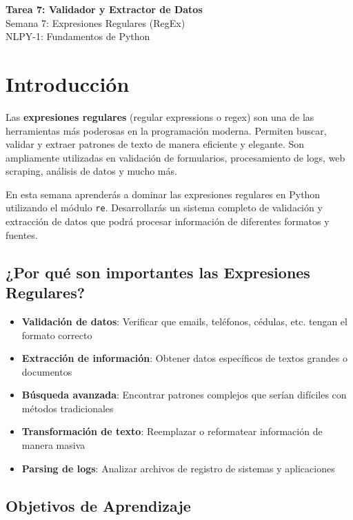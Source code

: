 \documentclass[11pt,letterpaper]{article}
\begin{document}
\begin{center}
    {\LARGE \textbf{Tarea 7: Validador y Extractor de Datos}}\\[0.3cm]
    {\Large Semana 7: Expresiones Regulares (RegEx)}\\[0.2cm]
    {\large NLPY-1: Fundamentos de Python}\\[0.2cm]
\end{center}

\section{Introducción}

Las \textbf{expresiones regulares} (regular expressions o regex) son una de las herramientas más poderosas en la programación moderna. Permiten buscar, validar y extraer patrones de texto de manera eficiente y elegante. Son ampliamente utilizadas en validación de formularios, procesamiento de logs, web scraping, análisis de datos y mucho más.

En esta semana aprenderás a dominar las expresiones regulares en Python utilizando el módulo \texttt{re}. Desarrollarás un sistema completo de validación y extracción de datos que podrá procesar información de diferentes formatos y fuentes.

\subsection{¿Por qué son importantes las Expresiones Regulares?}

\begin{itemize}
    \item \textbf{Validación de datos}: Verificar que emails, teléfonos, cédulas, etc. tengan el formato correcto
    \item \textbf{Extracción de información}: Obtener datos específicos de textos grandes o documentos
    \item \textbf{Búsqueda avanzada}: Encontrar patrones complejos que serían difíciles con métodos tradicionales
    \item \textbf{Transformación de texto}: Reemplazar o reformatear información de manera masiva
    \item \textbf{Parsing de logs}: Analizar archivos de registro de sistemas y aplicaciones
\end{itemize}

\subsection{Objetivos de Aprendizaje}
\end{document}

